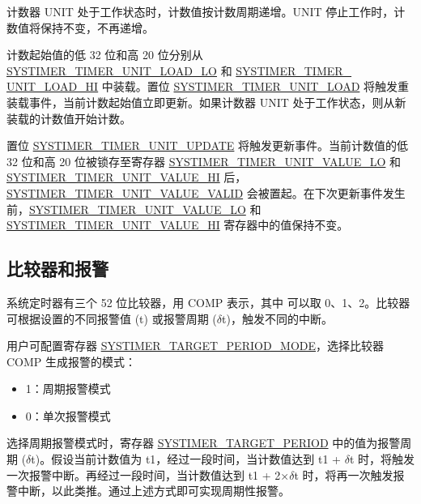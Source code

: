 \documentclass[main\_\_CN.tex]{subfiles}
\begin{document}
计数器 UNIT 处于工作状态时，计数值按计数周期递增。UNIT 停止工作时，计数值将保持不变，不再递增。

计数起始值的低 32 位和高 20 位分别从 \hyperref[fielddesc:SYSTIMERTIMERUNIT0LOADLO]{SYSTIMER\_TIMER\_UNIT\_LOAD\_LO} 和 \hyperref[fielddesc:SYSTIMERTIMERUNIT0LOADHI]{SYSTIMER\_TIMER\_\\UNIT{}\_LOAD\_HI} 中装载。置位 \hyperref[fielddesc:SYSTIMERTIMERUNIT0LOAD]{SYSTIMER\_TIMER\_UNIT\_LOAD} 将触发重装载事件，当前计数起始值立即更新。如果计数器 UNIT 处于工作状态，则从新装载的计数值开始计数。

置位 \hyperref[fielddesc:SYSTIMERTIMERUNIT0UPDATE]{SYSTIMER\_TIMER\_UNIT\_UPDATE} 将触发更新事件。当前计数值的低 32 位和高 20 位被锁存至寄存器 \hyperref[fielddesc:SYSTIMERTIMERUNIT0VALUELO]{SYSTIMER\_TIMER\_UNIT\_VALUE\_LO} 和 \hyperref[fielddesc:SYSTIMERTIMERUNIT0VALUEHI]{SYSTIMER\_TIMER\_UNIT\_VALUE\_HI} 后，\hyperref[fielddesc:SYSTIMERTIMERUNIT0VALUEVALID]{SYSTIMER\_TIMER\_UNIT\_VALUE\_VALID} 会被置起。在下次更新事件发生前，\hyperref[fielddesc:SYSTIMERTIMERUNIT0VALUELO]{SYSTIMER\_TIMER\_UNIT\_VALUE\_LO} 和 \hyperref[fielddesc:SYSTIMERTIMERUNIT0VALUEHI]{SYSTIMER\_TIMER\_UNIT\_VALUE\_HI} 寄存器中的值保持不变。




\subsection{比较器和报警}
系统定时器有三个 52 位比较器，用 COMP 表示，其中  可以取 0、1、2。比较器可根据设置的不同报警值 (t) 或报警周期 ($\delta$t)，触发不同的中断。

用户可配置寄存器 \hyperref[fielddesc:SYSTIMERTARGET0PERIODMODE]{SYSTIMER\_TARGET\_PERIOD\_MODE}，选择比较器 COMP 生成报警的模式：
\begin{itemize}
    \item 1：周期报警模式
    \item 0：单次报警模式
\end{itemize}

选择周期报警模式时，寄存器 \hyperref[fielddesc:SYSTIMERTARGET2PERIOD]{SYSTIMER\_TARGET\_PERIOD} 中的值为报警周期 ($\delta$t)。假设当前计数值为 t1，经过一段时间，当计数值达到 t1 + $\delta$t 时，将触发一次报警中断。再经过一段时间，当计数值达到 t1 + 2×$\delta$t 时，将再一次触发报警中断，以此类推。通过上述方式即可实现周期性报警。
\end{document}
